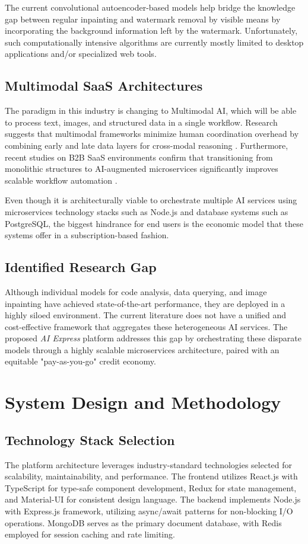 \documentclass[conference]{IEEEtran}
\begin{document}
The current convolutional autoencoder-based models help bridge the knowledge gap between regular inpainting and watermark removal by visible means by incorporating the background information left by the watermark. Unfortunately, such computationally intensive algorithms are currently mostly limited to desktop applications and/or specialized web tools.

\subsection{Multimodal SaaS Architectures}
The paradigm in this industry is changing to Multimodal AI, which will be able to process text, images, and structured data in a single workflow. Research suggests that multimodal frameworks minimize human coordination overhead by combining early and late data layers for cross-modal reasoning \cite{ibm2024multimodal}. Furthermore, recent studies on B2B SaaS environments confirm that transitioning from monolithic structures to AI-augmented microservices significantly improves scalable workflow automation \cite{vadrevu2025engineering}. 

Even though it is architecturally viable to orchestrate multiple AI services using microservices technology stacks such as Node.js and database systems such as PostgreSQL, the biggest hindrance for end users is the economic model that these systems offer in a subscription-based fashion.

\subsection{Identified Research Gap}
Although individual models for code analysis, data querying, and image inpainting have achieved state-of-the-art performance, they are deployed in a highly siloed environment. The current literature does not have a unified and cost-effective framework that aggregates these heterogeneous AI services. The proposed \textit{AI Express} platform addresses this gap by orchestrating these disparate models through a highly scalable microservices architecture, paired with an equitable "pay-as-you-go" credit economy.

\section{System Design and Methodology}
\subsection{Technology Stack Selection}
The platform architecture leverages industry-standard technologies selected for scalability, maintainability, and performance. The frontend utilizes React.js with TypeScript for type-safe component development, Redux for state management, and Material-UI for consistent design language. The backend implements Node.js with Express.js framework, utilizing async/await patterns for non-blocking I/O operations. MongoDB serves as the primary document database, with Redis employed for session caching and rate limiting.
\end{document}
